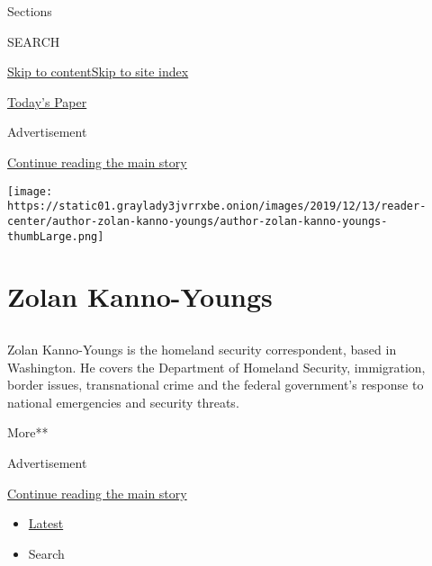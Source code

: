 Sections

SEARCH

\protect\hyperlink{site-content}{Skip to
content}\protect\hyperlink{site-index}{Skip to site index}

\href{https://myaccount.nytimes3xbfgragh.onion/auth/login?response_type=cookie\&client_id=vi}{}

\href{https://www.nytimes3xbfgragh.onion/section/todayspaper}{Today's
Paper}

Advertisement

\protect\hyperlink{after-top}{Continue reading the main story}

\texttt{[image: https://static01.graylady3jvrrxbe.onion/images/2019/12/13/reader-center/author-zolan-kanno-youngs/author-zolan-kanno-youngs-thumbLarge.png]}

\hypertarget{zolan-kanno-youngs}{%
\section{Zolan Kanno-Youngs}\label{zolan-kanno-youngs}}

\subsection{}

Zolan Kanno-Youngs is the homeland security correspondent, based in
Washington. He covers the Department of Homeland Security, immigration,
border issues, transnational crime and the federal government's response
to national emergencies and security threats.

More**

Advertisement

\protect\hyperlink{after-mid1}{Continue reading the main story}

\begin{itemize}
\tightlist
\item
  \protect\hyperlink{stream-panel}{Latest}
\item
  Search
\end{itemize}

